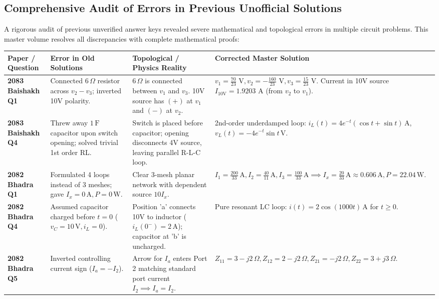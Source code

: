 \documentclass[11pt,a4paper,oneside]{article}
\begin{document}
\subsection*{Comprehensive Audit of Errors in Previous Unofficial Solutions}
A rigorous audit of previous unverified answer keys revealed severe mathematical and topological errors in multiple circuit problems. This master volume resolves all discrepancies with complete mathematical proofs:

\begin{center}
\footnotesize
\begin{tabular}{@{}lp{4.2cm}p{4.2cm}p{5cm}@{}}
\toprule
\textbf{Paper / Question} & \textbf{Error in Old Solutions} & \textbf{Topological / Physics Reality} & \textbf{Corrected Master Solution} \\
\midrule
\textbf{2083 Baishakh Q1} & Connected $6\,\Omega$ resistor across $v_2-v_3$; inverted 10V polarity. & $6\,\Omega$ is connected between $v_1$ and $v_3$. 10V source has $(+)$ at $v_1$ and $(-)$ at $v_2$. & $v_1 = \frac{70}{23}\text{ V}, v_2 = -\frac{160}{23}\text{ V}, v_3 = \frac{15}{23}\text{ V}$. Current in 10V source $I_{10\text{V}} = 1.9203\text{ A}$ (from $v_2$ to $v_1$). \\
\addlinespace
\textbf{2083 Baishakh Q4} & Threw away $1\,\mathrm{F}$ capacitor upon switch opening; solved trivial 1st order RL. & Switch is placed before capacitor; opening disconnects 4V source, leaving parallel R-L-C loop. & 2nd-order underdamped loop: $i_L(t) = 4e^{-t}(\cos t + \sin t)\,\mathrm{A}$, $v_L(t) = -4e^{-t}\sin t\,\mathrm{V}$. \\
\addlinespace
\textbf{2082 Bhadra Q1} & Formulated 4 loops instead of 3 meshes; gave $I_x = 0\,\mathrm{A}, P = 0\,\mathrm{W}$. & Clear 3-mesh planar network with dependent source $10I_x$. & $I_1 = \frac{200}{33}\,\mathrm{A}, I_2 = \frac{40}{11}\,\mathrm{A}, I_3 = \frac{100}{33}\,\mathrm{A} \implies I_x = \frac{20}{33}\,\mathrm{A} \approx 0.606\,\mathrm{A}, P = 22.04\,\mathrm{W}$. \\
\addlinespace
\textbf{2082 Bhadra Q4} & Assumed capacitor charged before $t=0$ ($v_C=10\,\mathrm{V}, i_L=0$). & Position 'a' connects 10V to inductor ($i_L(0^-)=2\,\mathrm{A}$); capacitor at 'b' is uncharged. & Pure resonant LC loop: $i(t) = 2\cos(1000t)\,\mathrm{A}$ for $t \ge 0$. \\
\addlinespace
\textbf{2082 Bhadra Q5} & Inverted controlling current sign ($I_a = -I_2$). & Arrow for $I_a$ enters Port 2 matching standard port current $I_2 \implies I_a = I_2$. & $Z_{11} = 3-j2\,\Omega, Z_{12} = 2-j2\,\Omega, Z_{21} = -j2\,\Omega, Z_{22} = 3+j3\,\Omega$. \\

\end{tabular}
\end{center}
\end{document}
